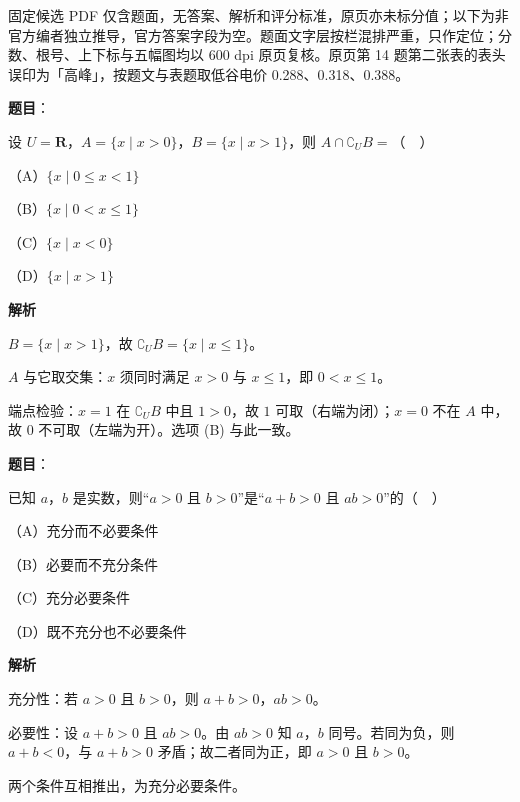 

\begin{gktip}
固定候选 PDF 仅含题面，无答案、解析和评分标准，原页亦未标分值；以下为非官方编者独立推导，官方答案字段为空。题面文字层按栏混排严重，只作定位；分数、根号、上下标与五幅图均以 600 dpi 原页复核。原页第 14 题第二张表的表头误印为「高峰」，按题文与表题取低谷电价 0.288、0.318、0.388。
\end{gktip}

\begin{answer}

\textbf{题目}：

设 $U=\mathbf R$，$A=\{x\mid x>0\}$，$B=\{x\mid x>1\}$，则 $A\cap\complement_U B=$（　）

（A）$\{x\mid 0\leqslant x<1\}$

（B）$\{x\mid 0<x\leqslant 1\}$

（C）$\{x\mid x<0\}$

（D）$\{x\mid x>1\}$

\textbf{解析}

$B=\{x\mid x>1\}$，故 $\complement_U B=\{x\mid x\leqslant1\}$。

$A$ 与它取交集：$x$ 须同时满足 $x>0$ 与 $x\leqslant1$，即 $0<x\leqslant1$。

端点检验：$x=1$ 在 $\complement_U B$ 中且 $1>0$，故 $1$ 可取（右端为闭）；$x=0$ 不在 $A$ 中，故 $0$ 不可取（左端为开）。选项 (B) 与此一致。


\end{answer}
\begin{answer}

\textbf{题目}：

已知 $a$，$b$ 是实数，则“$a>0$ 且 $b>0$”是“$a+b>0$ 且 $ab>0$”的（　）

（A）充分而不必要条件

（B）必要而不充分条件

（C）充分必要条件

（D）既不充分也不必要条件

\textbf{解析}

充分性：若 $a>0$ 且 $b>0$，则 $a+b>0$，$ab>0$。

必要性：设 $a+b>0$ 且 $ab>0$。由 $ab>0$ 知 $a$，$b$ 同号。若同为负，则 $a+b<0$，与 $a+b>0$ 矛盾；故二者同为正，即 $a>0$ 且 $b>0$。

两个条件互相推出，为充分必要条件。


\end{answer}
